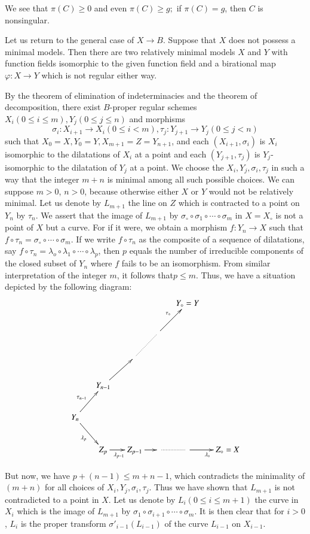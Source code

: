 We see that $\pi(C)\geq 0$ and even $\pi(C) \geq g;$ if $\pi(C)=g$,
then $C$ is nonsingular. 

Let us return to the general case of $X \to B$. Suppose that $X$ does
not possess a minimal models. Then there are two relatively minimal
models $X$ and $Y$ with function fields isomorphic to the given
function field and a birational map $\varphi:X \to Y$ which is not
regular either way. 

By the theorem of elimination of indeterminacies and the theorem of
decomposition, there exist $B$-proper regular  schemes\pageoriginale
$X_i(0 \leq i 
\leq m), Y_j(0 \leq j \leq n)$ and morphisms 
$$
\sigma_i:X_{i+1} \to X_i(0
\leq i < m), \tau _j: Y_{j+1} \to Y_j(0 \leq j < n)
$$
 such that
$X_0=X,Y_0=Y, X_{m+1}=Z=Y_{n+1}$, and each $(X_{i+1}, \sigma_i)$ is
$X_i$ isomorphic to the dilatations of $X_i$ at a point and each
$(Y_{j+1},\tau_j)$ is $Y_j$-isomorphic to the dilatation of $Y_j$ at a
point. We choose the $X_i,Y_j, \sigma_i, \tau_j$ in such a way that
the integer $m+n$ is minimal among all such possible choices. We can
suppose $m>0$, $n>0$, because otherwise either $X$ or $Y$ would not be
relatively minimal. Let us denote by $L_{m+1}$ the line on $Z$ which
is contracted to a point on $Y_n$ by $\tau_n$. We assert that the
image of $L_{m+1}$ by $\sigma_\circ  \circ \sigma_1 \circ \cdots \circ
\sigma_m$ in $X=X_\circ$
is not a point of $X$ but a curve. For if it were, we obtain a
morphism $f:Y_n \to X$ such that $f \circ \tau_n =\sigma_\circ
\circ \cdots \circ \sigma_m$. If we write $f \circ \tau_n$ as
the composite of a 
sequence of dilatations, say $f \circ \tau_n=\lambda_o \circ \lambda_1 \circ
\cdots \circ \lambda_p$, then $p$ equals the number of irreducible
components of the closed subset of $Y_n$ where $f$ fails to be an
isomorphism. From similar interpretation of the integer $m$, it follows
that\pageoriginale $p \leq m$. Thus, we have a situation depicted by
the following diagram:  
\[
\xymatrix@C=.5cm{&&&&Y_\circ=Y& \\
  &&& \ar[ur]^{\tau_\circ}&&\\
  && \ar@{.}[ur]& &&\\
  & Y_{n-1} \ar[ur]&  & && \\
  \ar[ur]^{\tau_{n-1}}
  Y_n \ar[dr]_{\lambda_p} &&&&&\\
  & Z_p \ar[r]_{\lambda_{p-1}} & Z_{p-1} \ar[r] & \ar@{.}[r] &
  \ar[r]_{\lambda_\circ} & Z_\circ=X
}
\]

But now, we have $p+(n-1) \leq m+n-1$, which contradicts the
minimality of $(m+n)$ for all choices of $X_i,Y_j, \sigma_i,
\tau_j$. Thus we have shown that $L_{m+1}$ is not contradicted to a
point in $X$. Let us denote by $L_i(0 \leq i \leq m+1)$ the curve in
$X_i$ which is the image of $L_{m+1}$ by $\sigma_1 \circ \sigma_{i+1} \circ
\cdots \circ \sigma_m$. It is then clear that for $i>0$, $L_i$ is the proper
transform $\sigma'_{i-1}(L_{i-1})$ of the curve $L_{i-1}$ on
$X_{i-1}$. 

